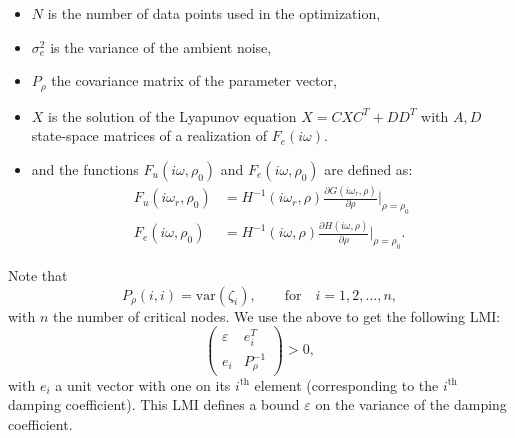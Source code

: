 \documentclass{article}
\begin{document}
\begin{itemize}
	\item $N$ is the number of data points used in the optimization,
	\item $\sigma_e^2$ is the variance of the ambient noise,
	\item $P_\rho$ the covariance matrix of the parameter vector,
	\item $X$ is the solution of the Lyapunov equation $X=CXC^T+DD^T$ with $A,D$ state-space matrices of a realization of $F_e(i\omega)$.  
	\item and the functions $F_u(i\omega,\rho_0)$ and $F_e(i\omega,\rho_0)$ are defined as:
	\begin{equation}
	\begin{aligned}
	 F_u(i\omega_r,\rho_0) &= H^{-1}(i \omega_r,\rho) \frac{\partial G(i\omega_r , \rho )}{\partial \rho} \Bigg|_{\rho=\rho_0} \\
	 F_e(i\omega,\rho_0) &= H^{-1}(i \omega,\rho) \frac{\partial H(i\omega , \rho )}{\partial \rho} \Bigg|_{\rho=\rho_0}.
	\end{aligned}
	\end{equation}
\end{itemize}

Note that 
\begin{equation}
P_\rho(i,i) = \text{var} (\zeta_i), \qquad \text{for} \quad i=1,2,\ldots,n,
\end{equation}
with $n$ the number of critical nodes. We use the above to get the following LMI:
\begin{equation}
\begin{pmatrix} \varepsilon & e_i^T \\ e_i & P_\rho^{-1} \end{pmatrix} > 0,
\end{equation}
with $e_i$ a unit vector with one on its $i^{\text{th}}$ element (corresponding to the $i^{\text{th}}$ damping coefficient). This LMI defines a bound $\varepsilon$ on the variance of the damping coefficient.
\end{document}
